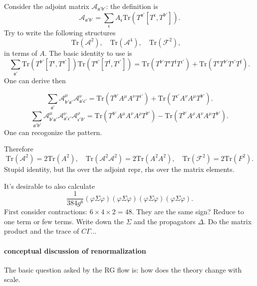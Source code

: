 
Consider the adjoint matrix $\mathcal{A}_{\mathfrak{a}'\mathfrak{b}'}$:
the definition is
\[
	\mathcal{A}_{\mathfrak{a}'\mathfrak{b}'}
	= \sum_{\mathfrak{c}} A_{\mathfrak{c}}
	\mathrm{Tr} ( T^{\mathfrak{a}'} [T^{\mathfrak{c}},T^{\mathfrak{b}'}])
.\] 
Try to write the following structures
\[
\mathrm{Tr}(\mathcal{A}^2),\quad
\mathrm{Tr}(\mathcal{A}^4),\quad
\mathrm{Tr}(\mathcal{F}^2),\quad
\] 
in terms of $A$.
The basic identity to use is
\[
	\sum_{\mathfrak{a}'} \mathrm{Tr}( T^{\mathfrak{b}'}
	[T^{\mathfrak{e}},T^{\mathfrak{a}'}])
	\mathrm{Tr}(T^{\mathfrak{a}'}[T^{\mathfrak{f}},T^{\mathfrak{c}'}])
	=\mathrm{Tr}(T^{\mathfrak{b}'}T^{\mathfrak{e}}
	T^{\mathfrak{f}}T^{\mathfrak{c}'})
	+\mathrm{Tr}(T^{\mathfrak{e}}T^{\mathfrak{b}'}
	T^{\mathfrak{c}'}T^{\mathfrak{f}})
.\] 
One can derive then
\begin{correct}
\[
	\sum_{\mathfrak{a}'}
	\mathcal{A}_{\mathfrak{b}' \mathfrak{a}'}^\mu
	\mathcal{A}_{\mathfrak{a}' \mathfrak{c}'}^\nu
	= \mathrm{Tr}(T^{\mathfrak{b}'} A^\mu A^\nu T^{\mathfrak{c}'})
	+ \mathrm{Tr}(T^{\mathfrak{c}'} A^\nu A^\mu T^{\mathfrak{b}'})
.\] 
\[
	\sum_{\mathfrak{a}' \mathfrak{b}'}
	\mathcal{A}^\mu_{\mathfrak{b}' \mathfrak{a}'}
	\mathcal{A}^\nu_{\mathfrak{a}' \mathfrak{c}'}
	\mathcal{A}^\rho_{\mathfrak{c}' \mathfrak{d}'}
	= \mathrm{Tr}(T^{\mathfrak{b}'}A^\mu A^\nu A^\rho T^{\mathfrak{d}'})
	- \mathrm{Tr}(T^{\mathfrak{d}'} A^\rho A^\nu A^\mu T^{\mathfrak{b}'})
.\] 
One can recogonize the pattern.
\end{correct}
Therefore
\[
\mathrm{Tr}(\mathcal{A}^2) = 2 \mathrm{Tr}(A^2),\quad
\mathrm{Tr} (\mathcal{A}^2 \mathcal{A}^2) = 2 \mathrm{Tr} (A^2 A^2),\quad
\mathrm{Tr}(\mathcal{F}^2) = 2 \mathrm{Tr}(F^2)
.\] 
Stupid identity, but lhs over the adjoint repr, rhs over the matrix elements.

It's desirable to also calculate
\[
\frac{1}{384 g^6} (\varphi \Sigma \varphi)(\varphi \Sigma \varphi)(\varphi \Sigma \varphi)(\varphi \Sigma \varphi)
.\] 
First consider contractions: $6 \times 4 \times 2 = 48$.
They are the same sign? Reduce to one term or few terms.
Write down the $\Sigma$ and the propagators $\Delta$.
Do the matrix product and the trace of $C\Gamma$...

\newpage

\paragraph{conceptual discussion of renormalization}
The basic question asked by the RG flow is:
how does the theory change with scale.


